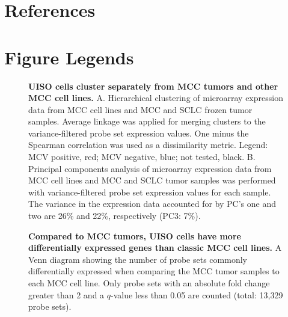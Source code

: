 \documentclass[10pt]{article}
\begin{document}
\section*{References}
\begin{singlespace}

\end{singlespace}

\newpage

\section*{Figure Legends}

\begin{figure}[!ht]
  \begin{center}
  \end{center}
  
  \caption{
    {\bf UISO cells cluster separately from MCC tumors and other MCC cell lines.}
    A. Hierarchical clustering of microarray expression data from MCC cell lines and MCC and SCLC frozen tumor samples.
    Average linkage was applied for merging clusters to the variance-filtered probe set expression values.
    One minus the Spearman correlation was used as a dissimilarity metric.
    Legend: MCV positive, red; MCV negative, blue; not tested, black.
    B. Principal components analysis of microarray expression data from MCC cell lines and MCC and SCLC tumor samples was performed with variance-filtered probe set expression values for each sample.
    The variance in the expression data accounted for by PC’s one and two are 26\% and 22\%, respectively (PC3: 7\%).}
  
  \label{fig:clustering}

\end{figure}

\begin{figure}[!ht]

  \begin{center}
  \end{center}

  \caption{
    {\bf Compared to MCC tumors, UISO cells have more differentially expressed genes than classic MCC cell lines.}
    A Venn diagram showing the number of probe sets commonly differentially expressed when comparing the MCC tumor samples to each MCC cell line.
    Only probe sets with an absolute fold change greater than 2 and a $q$-value less than 0.05 are counted (total: 13,329 probe sets).}

  \label{fig:venn}
\end{figure}
\end{document}
